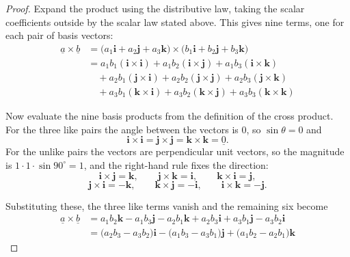 \documentclass[11pt,a4paper]{article}
\theoremstyle{definition}
\begin{document}
\begin{proof}
Expand the product using the distributive law, taking the scalar coefficients
outside by the scalar law stated above. This gives nine terms, one for each
pair of basis vectors:
\begin{align*}
\underline{a}\times\underline{b}
&= \big(a_1\textbf{i} + a_2\textbf{j} + a_3\textbf{k}\big)\times
   \big(b_1\textbf{i} + b_2\textbf{j} + b_3\textbf{k}\big)\\
&= a_1b_1(\textbf{i}\times\textbf{i}) + a_1b_2(\textbf{i}\times\textbf{j})
 + a_1b_3(\textbf{i}\times\textbf{k})\\
&\quad + a_2b_1(\textbf{j}\times\textbf{i}) + a_2b_2(\textbf{j}\times\textbf{j})
 + a_2b_3(\textbf{j}\times\textbf{k})\\
&\quad + a_3b_1(\textbf{k}\times\textbf{i}) + a_3b_2(\textbf{k}\times\textbf{j})
 + a_3b_3(\textbf{k}\times\textbf{k})
\end{align*}

Now evaluate the nine basis products from the definition of the cross product.
For the three like pairs the angle between the vectors is $0$, so
$\sin\theta = 0$ and
$$\textbf{i}\times\textbf{i} = \textbf{j}\times\textbf{j}
= \textbf{k}\times\textbf{k} = \underline{0}.$$
For the unlike pairs the vectors are perpendicular unit vectors, so the
magnitude is $1\cdot 1\cdot\sin 90^\circ = 1$, and the right-hand rule fixes the
direction:
$$\textbf{i}\times\textbf{j} = \textbf{k},\qquad
\textbf{j}\times\textbf{k} = \textbf{i},\qquad
\textbf{k}\times\textbf{i} = \textbf{j},$$
$$\textbf{j}\times\textbf{i} = -\textbf{k},\qquad
\textbf{k}\times\textbf{j} = -\textbf{i},\qquad
\textbf{i}\times\textbf{k} = -\textbf{j}.$$

Substituting these, the three like terms vanish and the remaining six become
\begin{align*}
\underline{a}\times\underline{b}
&= a_1b_2\textbf{k} - a_1b_3\textbf{j} - a_2b_1\textbf{k}
 + a_2b_3\textbf{i} + a_3b_1\textbf{j} - a_3b_2\textbf{i}\\
&= \big(a_2b_3 - a_3b_2\big)\textbf{i}
 - \big(a_1b_3 - a_3b_1\big)\textbf{j}
 + \big(a_1b_2 - a_2b_1\big)\textbf{k}
\end{align*}


\end{proof}
\end{document}

